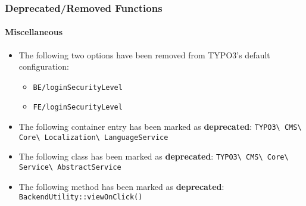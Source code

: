 %

\begin{frame}[fragile]
	\frametitle{Deprecated/Removed Functions}
	\framesubtitle{Miscellaneous}

	\begin{itemize}
		\item The following two options have been removed from TYPO3's default
			configuration:
			\begin{itemize}
				\item \texttt{BE/loginSecurityLevel}
				\item \texttt{FE/loginSecurityLevel}
			\end{itemize}

		\item The following container entry has been marked as
			\textbf{deprecated}:\newline
			\small\texttt{TYPO3\textbackslash
				CMS\textbackslash
				Core\textbackslash
				Localization\textbackslash
				LanguageService}\normalsize

		\item The following class has been marked as \textbf{deprecated}:\newline
			\texttt{TYPO3\textbackslash
				CMS\textbackslash
				Core\textbackslash
				Service\textbackslash
				AbstractService}

		\item The following method has been marked as \textbf{deprecated}:\newline
			\texttt{BackendUtility::viewOnClick()}

	\end{itemize}

\end{frame}

